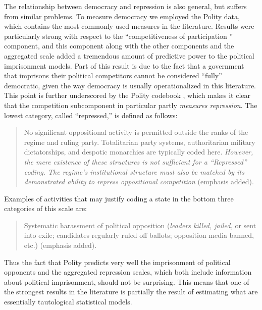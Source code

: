 \documentclass[11pt]{article}
\begin{document}
The relationship between democracy and repression is also general, but suffers from similar problems. To measure democracy we employed the Polity data, which contains the most commonly used measures in the literature. Results were particularly strong with respect to the ``competitiveness of participation '' component, and this component along with the other components and the aggregated scale added a tremendous amount of predictive power to the political imprisonment models. Part of this result is due to the fact that a government that imprisons their political competitors cannot be considered ``fully'' democratic, given the way democracy is usually operationalized in this literature. This point is further underscored by the Polity codebook \citep[][p.\ 26]{MarshallJaggers2009}, which makes it clear that the competition subcomponent in particular partly {\it measures repression}. The lowest category, called ``repressed,'' is defined as follows:
\begin{quote}
No significant oppositional activity is permitted outside the ranks of the regime and ruling party. Totalitarian party systems, authoritarian military dictatorships, and despotic monarchies are typically coded here. {\it However, the mere existence of these structures is not sufficient for a ``Repressed'' coding. The regime's institutional structure must also be matched by its demonstrated ability to repress oppositional competition} (emphasis added).
\end{quote}
\noindent
Examples of activities that may justify coding a state in the bottom three categories of this scale are:
\begin{quote}
Systematic harassment of political opposition ({\em leaders killed, jailed,} or sent into exile; candidates regularly ruled off ballots; opposition media banned, etc.) (emphasis added). 
\end{quote}
\noindent
Thus the fact that Polity predicts very well the imprisonment of political opponents and the aggregated repression scales, which both include information about political imprisonment, should not be surprising. This means that one of the strongest results in the literature is partially the result of estimating what are essentially tautological statistical models. 
\end{document}
